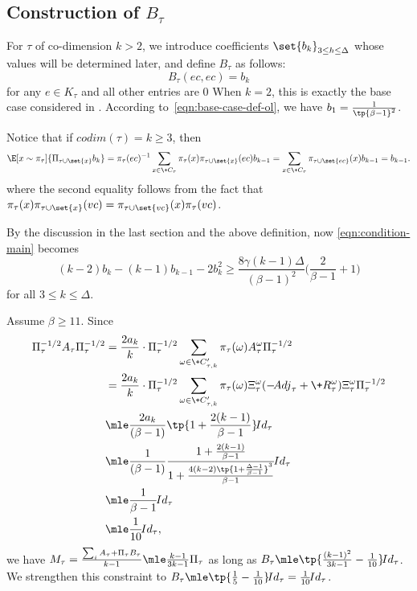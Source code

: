 \documentclass[a4paper,11pt]{article}
\begin{document}
\subsection{Construction of $B_\tau$}
\label{sss:Btau}
For $\tau$ of co-dimension $k > 2$,
we introduce coefficients $\set{b_k}_{3 \leq h \leq \Delta}$
whose values will be determined later, and define $B_\tau$ as follows:
\begin{equation} \label{eqn:B-def}
	B_\tau(ec,ec) = b_{k}
\end{equation}
for any $e \in K_\tau$ and all other entries are $0$
When $k=2$, this is exactly the base case considered in .
According to~\eqref{eqn:base-case-def-ol}, we have $b_1=\frac1{\tp{\beta-1}^2}$.

Notice that if $\!{codim}(\tau) = k\ge 3$, then
\begin{align}
\E[x\sim\pi_\tau]{\Pi_{\tau\cup\set{x}} b_k}
=
\pi_\tau(ec)^{-1}\sum_{x\in \+C_\tau}{\pi_\tau(x)\pi_{\tau\cup \set{x}}(ec)} b_{k-1}
=
\sum_{x\in \+C_\tau}{\pi_{\tau\cup \set{ec}}(x) b_{k-1}} = b_{k-1}.
\label{eqn:contraint-B-entry}
\end{align}
where the second equality follows from the fact that $\pi_\tau(x)\pi_{\tau\cup \set{x}}(vc)=\pi_{\tau\cup\set{vc}}(x)\pi_\tau(vc)$. 

By the discussion in the last section and the above definition, now \cref{eqn:condition-main} 
becomes
\[
(k-2)b_k - (k-1)b_{k-1} - 2b_k^2 \ge 
    \frac{8\gamma(k-1)\Delta}{(\beta-1)^2}\Big(\frac{2}{\beta-1} + 1\Big)
\]
for all $3\le k \le \Delta$.

Assume $\beta \geq 11$. Since 
\begin{align}\label{eqn:A-tau-i-upper-bound}
\begin{split}
		\Pi_\tau^{-1/2}A_\tau\Pi_\tau^{-1/2}
		&=  \frac{2a_{k}}{k}\cdot \Pi_\tau^{-1/2} \sum_{\omega\in \+C'_{\tau,k}}\pi_\tau(\omega) A^{\omega}_\tau \Pi_\tau^{-1/2} \\
		&=  \frac{2a_{k}}{k}\cdot \Pi_\tau^{-1/2} \sum_{\omega\in \+C_{\tau,k}'}\pi_\tau(\omega) \Xi_\tau^{\omega}(-\!{Adj}_\tau +\+R_\tau^{\omega})\Xi_\tau^{\omega}\Pi_\tau^{-1/2}\\
		&\mle \frac{2a_{k}}{(\beta-1)}\tp{1+\frac{2(k-1)}{\beta-1}}\!{Id}_\tau\\
		&\mle \frac{1}{(\beta-1)}\frac{1+\frac{2(k-1)}{\beta-1}}{1+\frac{4(k-2) \tp{1+\frac{\Delta-1}{\beta-1}}^3} {\beta-1}}\!{Id}_\tau\\
        &\mle \frac{1}{\beta-1} \!{Id}_\tau\\
		&\mle \frac{1}{10}\!{Id}_\tau,
\end{split}
\end{align}
we have $M_\tau=\frac{\sum_i A_\tau + \Pi_\tau B_\tau}{k-1} \mle \frac{k-1}{3k-1}\Pi_\tau$ as long as $B_\tau \mle \tp{\frac{(k-1)^2}{3k-1}-\frac{1}{10}}\!{Id}_\tau$.
We strengthen this constraint to $B_\tau \mle \tp{\frac{1}{5}-\frac{1}{10}}\!{Id}_\tau=\frac{1}{10}\!{Id}_\tau$.
\end{document}
